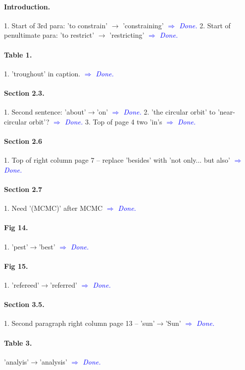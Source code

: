 \documentclass[10pt,a4paper]{article}
\newcommand{\Comment}[1]{\textsl{\textcolor{Blue}{$\Longrightarrow$ {#1}}}}
\begin{document}
\paragraph{Introduction.} 1. Start of 3rd para: 'to constrain' $\rightarrow$ 'constraining'  \Comment{Done.} 2. Start of penultimate para: 'to restrict' $\rightarrow$ 'restricting' \Comment{Done.}

\paragraph{Table 1.} 1. 'troughout' in caption. \Comment{Done.}

\paragraph{Section 2.3.} 1. Second sentence: 'about'$\rightarrow$'on' \Comment{Done.} 2. 'the circular orbit' to 'near-circular orbit'? \Comment{Done.} 3. Top of page 4 two 'in's \Comment{Done.}

\paragraph{Section 2.6} 1. Top of right column page 7 -- replace 'besides' with 'not only... but also' \Comment{Done.}

\paragraph{Section 2.7} 1. Need '(MCMC)' after MCMC \Comment{Done.}

\paragraph{Fig 14.} 1. 'pest'$\rightarrow$'best' \Comment{Done.}

\paragraph{Fig 15.} 1. 'refereed'$\rightarrow$'referred'  \Comment{Done.}

\paragraph{Section 3.5.} 1. Second paragraph right column page 13 -- 'sun'$\rightarrow$'Sun' \Comment{Done.}

\paragraph{Table 3.} 'analyis'$\rightarrow$'analysis'  \Comment{Done.}
\end{document}
